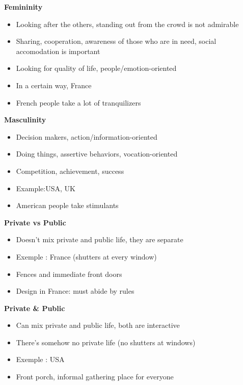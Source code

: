 \documentclass[11pt,a4paper,oneside,french,svgnames]{report}
\begin{document}
\begin{center}
\begin{minipage}[t]{.49\textwidth}
\centering\textbf{Femininity}\\
  \begin{itemize}
    \item Looking after the others, standing out from the crowd is not admirable
    \item Sharing, cooperation, awareness of those who are in need, social accomodation is important
    \item Looking for quality of life, people/emotion-oriented
    \item In a certain way, France
    \item French people take a lot of tranquilizers
  \end{itemize}
\end{minipage}
\begin{minipage}[t]{.49\textwidth}
\centering\textbf{Masculinity}\\
  \begin{itemize}
    \item Decision makers, action/information-oriented
    \item Doing things, assertive behaviors, vocation-oriented
    \item Competition, achievement, success
    \item Example:USA, UK
    \item American people take stimulants
  \end{itemize}
\end{minipage}

\begin{minipage}[t]{.49\textwidth}
\centering\textbf{Private vs Public}\\
  \begin{itemize}
    \item Doesn't mix private and public life, they are separate
    \item Exemple : France (shutters at every window)
    \item Fences and immediate front doors
    \item Design in France: must abide by rules
  \end{itemize}
\end{minipage}
\begin{minipage}[t]{.49\textwidth}
\centering\textbf{Private \& Public}\\
  \begin{itemize}
    \item Can mix private and public life, both are interactive
    \item There's somehow no private life (no shutters at windows)
    \item Exemple : USA
    \item Front porch, informal gathering place for everyone
  \end{itemize}
\end{minipage}


\end{center}
\end{document}
